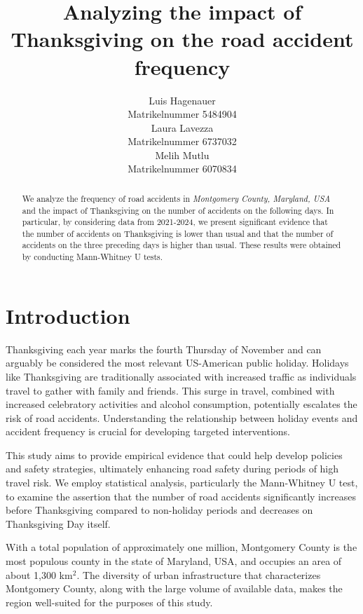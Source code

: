\documentclass{article}
\title{Analyzing the impact of Thanksgiving on the road accident frequency}
\author{%
  Luis Hagenauer \\
  Matrikelnummer 5484904 \\
  \And
  Laura Lavezza \\
  Matrikelnummer 6737032 \\
  \And
  Melih Mutlu \\
  Matrikelnummer 6070834
}
\begin{document}
\maketitle

\begin{abstract}
  We analyze the frequency of road accidents in \emph{Montgomery County,
  Maryland, USA} and the impact of Thanksgiving on the number of accidents on
  the following days. In particular, by considering data from 2021-2024, we
  present significant evidence that the number of accidents on Thanksgiving is
  lower than usual and that the number of accidents on the three preceding days
  is higher than usual. These results were obtained by conducting Mann-Whitney U
  tests.
\end{abstract}

\section{Introduction}\label{sec:introduction}
Thanksgiving each year marks the fourth Thursday of November and can arguably be
considered the most relevant US-American public holiday. Holidays like
Thanksgiving are traditionally associated with increased traffic as individuals
travel to gather with family and friends. This surge in travel, combined with
increased celebratory activities and alcohol consumption, potentially escalates
the risk of road accidents. Understanding the relationship between holiday
events and accident frequency is crucial for developing targeted interventions.

This study aims to provide empirical evidence that could help develop policies
and safety strategies, ultimately enhancing road safety during periods of high
travel risk. We employ statistical analysis, particularly the Mann-Whitney U
test, to examine the assertion that the number of road accidents significantly
increases before Thanksgiving compared to non-holiday periods and decreases on
Thanksgiving Day itself.

With a total population of approximately one million, Montgomery County is the
most populous county in the state of Maryland, USA, and occupies an area of
about 1,300 km$^2$.  The diversity of urban infrastructure that characterizes
Montgomery County, along with the large volume of available data, makes the
region well-suited for the purposes of this study.
\end{document}

